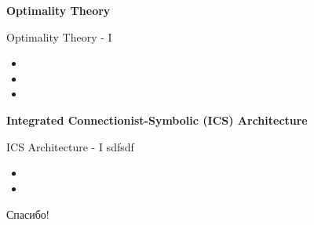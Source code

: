 \documentclass{beamer}
\begin{document}
\begin{frame}{}
\begin{center}
	\textbf{Optimality Theory}
\end{center}
\end{frame}


\begin{frame}{Optimality Theory - I}
\begin{itemize}
	\item 
	\medskip
	\item 
	\medskip
	\item 
\end{itemize}
\end{frame}


\begin{frame}{}
\begin{center}
	\textbf{Integrated Connectionist-Symbolic (ICS) Architecture}
\end{center}
\end{frame}

\begin{frame}{ICS Architecture - I}
sdfsdf
\bigskip
\begin{itemize}
	\item 
	\medskip
	\item 
\end{itemize}
\end{frame}


\begin{frame}{}
    \thispagestyle{empty}
    \begin{center}
        {\large Спасибо!}
    \end{center}
\end{frame}
\end{document}

